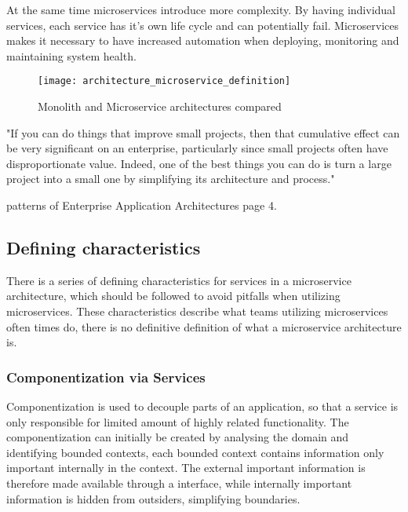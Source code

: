 At the same time microservices introduce more complexity. By having individual services, each service has it's own life cycle and can potentially fail. Microservices makes it necessary to have increased automation when deploying, monitoring and maintaining system health\cite{meshenberg2016microservices}.

\begin{figure}[!htb]
  \texttt{[image: architecture\_microservice\_definition]}  
  \caption{Monolith and Microservice architectures compared}
  \label{fig:architecture_microservice_definition}
\end{figure}

"If you can do things that improve small projects, then that cumulative effect can be very significant on an enterprise, particularly since small projects often have disproportionate value. Indeed, one of the best things you can do is turn a large project into a small one by simplifying its architecture and process."

patterns of Enterprise Application Architectures page 4.


\subsection{Defining characteristics}
There is a series of defining characteristics for services in a microservice architecture, which should be followed to avoid pitfalls when utilizing microservices. These characteristics describe what teams utilizing microservices often times do, there is no definitive definition of what a microservice architecture is.

\subsubsection*{Componentization via Services}
Componentization is used to decouple parts of an application, so that a service is only responsible for limited amount of highly related functionality\cite{morgantini2013whatAreMicroServices}. The componentization can initially be created by analysing the domain and identifying bounded contexts\cite[p.~31]{newman2015microservices}, each bounded context contains information only important internally in the context. 
The external important information is therefore made available through a interface, while internally important information is hidden from outsiders, simplifying boundaries.


